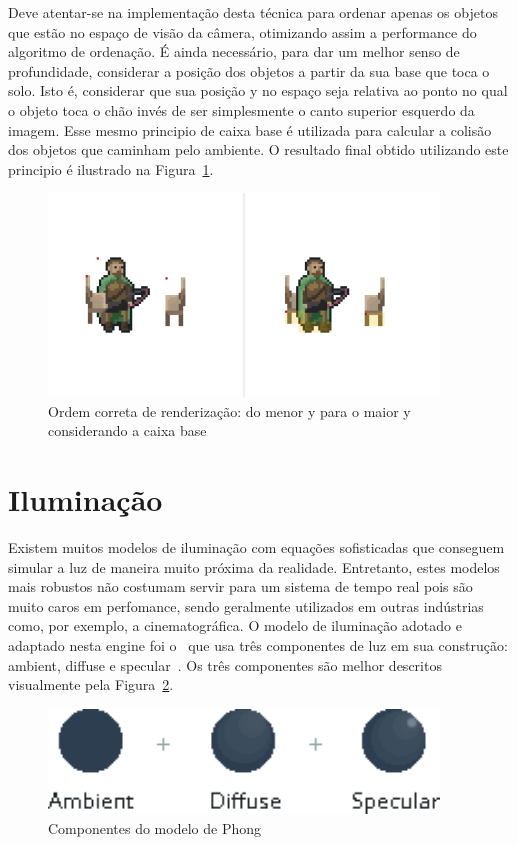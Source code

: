 \documentclass[12pt, 
openright, 
oneside, 
a4paper,    
brazil]{facom-ufu-abntex2}
\begin{document}
Deve atentar-se na implementação desta técnica para ordenar apenas os objetos que estão no espaço de visão da câmera, otimizando assim a performance do algoritmo de ordenação. É ainda necessário, para dar um melhor senso de profundidade, considerar a posição dos objetos a partir da sua base que toca o solo. Isto é, considerar que sua posição y no espaço seja relativa ao ponto no qual o objeto toca o chão invés de ser simplesmente o canto superior esquerdo da imagem. Esse mesmo principio de caixa base é utilizada para calcular a colisão dos objetos que caminham pelo ambiente. O resultado final obtido utilizando este principio é ilustrado na Figura~\ref{fig:zOrderBaseBox}.


\begin{figure}[H]
	\centering
	\includegraphics[width=28em]{imagens/zOrderWithBaseBox.png}
	\caption{Ordem correta de renderização: do menor y para o maior y considerando a caixa base}
	\label{fig:zOrderBaseBox}
\end{figure}



\section{Iluminação}
Existem muitos modelos de iluminação com equações sofisticadas que conseguem simular a luz de maneira muito próxima da realidade. Entretanto, estes modelos mais robustos não costumam servir para um sistema de tempo real pois são muito caros em perfomance, sendo geralmente utilizados em outras indústrias como, por exemplo, a cinematográfica.
O modelo de iluminação adotado e adaptado nesta engine foi o~ que usa três componentes de luz em sua construção: ambient, diffuse e specular~\cite{PhongShading}. Os três componentes são melhor descritos visualmente pela Figura~\ref{fig:phongModel}.

\begin{figure}[H]
	\centering
	\includegraphics[width=28em]{imagens/lightning.png}
	\caption{Componentes do modelo de Phong}
	\label{fig:phongModel}
\end{figure}
\end{document}
